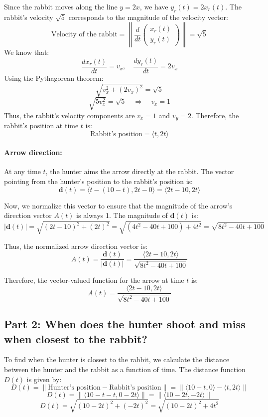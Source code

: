\documentclass[11pt]{article}
\begin{document}
Since the rabbit moves along the line \( y = 2x \), we have \( y_r(t) = 2x_r(t) \). The rabbit's velocity \( \sqrt{5} \) corresponds to the magnitude of the velocity vector:
\[
\text{Velocity of the rabbit} = \left\| \frac{d}{dt} \begin{pmatrix} x_r(t) \\ y_r(t) \end{pmatrix} \right\| = \sqrt{5}
\]
We know that:
\[
\frac{dx_r(t)}{dt} = v_x, \quad \frac{dy_r(t)}{dt} = 2v_x
\]
Using the Pythagorean theorem:
\[
\sqrt{v_x^2 + (2v_x)^2} = \sqrt{5}
\]
\[
\sqrt{5v_x^2} = \sqrt{5} \quad \Rightarrow \quad v_x = 1
\]
Thus, the rabbit's velocity components are \( v_x = 1 \) and \( v_y = 2 \). Therefore, the rabbit's position at time \( t \) is:
\[
\text{Rabbit's position} = \langle t, 2t \rangle
\]

\paragraph{Arrow direction:}
At any time \( t \), the hunter aims the arrow directly at the rabbit. The vector pointing from the hunter's position to the rabbit's position is:
\[
\mathbf{d}(t) = \langle t - (10 - t), 2t - 0 \rangle = \langle 2t - 10, 2t \rangle
\]

Now, we normalize this vector to ensure that the magnitude of the arrow's direction vector \( A(t) \) is always 1. The magnitude of \( \mathbf{d}(t) \) is:
\[
|\mathbf{d}(t)| = \sqrt{(2t - 10)^2 + (2t)^2} = \sqrt{(4t^2 - 40t + 100) + 4t^2} = \sqrt{8t^2 - 40t + 100}
\]

Thus, the normalized arrow direction vector is:
\[
A(t) = \frac{\mathbf{d}(t)}{|\mathbf{d}(t)|} = \frac{\langle 2t - 10, 2t \rangle}{\sqrt{8t^2 - 40t + 100}}
\]

Therefore, the vector-valued function for the arrow at time \( t \) is:
\[
A(t) = \frac{\langle 2t - 10, 2t \rangle}{\sqrt{8t^2 - 40t + 100}}
\]

\newpage

\subsection{Part 2: When does the hunter shoot and miss when closest to the rabbit?}

To find when the hunter is closest to the rabbit, we calculate the distance between the hunter and the rabbit as a function of time. The distance function \( D(t) \) is given by:
\[
D(t) = \left\| \text{Hunter's position} - \text{Rabbit's position} \right\| = \left\| \langle 10 - t, 0 \rangle - \langle t, 2t \rangle \right\|
\]
\[
D(t) = \left\| \langle 10 - t - t, 0 - 2t \rangle \right\| = \left\| \langle 10 - 2t, -2t \rangle \right\|
\]
\[
D(t) = \sqrt{(10 - 2t)^2 + (-2t)^2} = \sqrt{(10 - 2t)^2 + 4t^2}
\]
\end{document}
